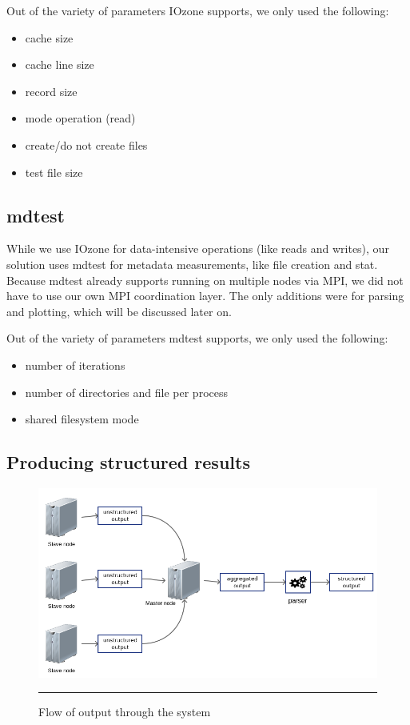 Out of the variety of parameters IOzone supports, we only used the following:

\begin{itemize}

\item cache size
\item cache line size
\item record size
\item mode operation (read)
\item create/do not create files
\item test file size

\end{itemize}



\subsection{mdtest}

While we use IOzone for data-intensive operations (like reads and writes), our solution uses mdtest for metadata measurements, like file creation and stat. Because mdtest already supports running on multiple nodes via MPI, we did not have to use our own MPI coordination layer. The only additions were for parsing and plotting, which will be discussed later on.

Out of the variety of parameters mdtest supports, we only used the following:

\begin{itemize}

\item number of iterations
\item number of directories and file per process
\item shared filesystem mode

\end{itemize}






\subsection{Producing structured results}


\begin{figure}[H]
  \centering
    \includegraphics[scale=0.5]{Figures/output_flow.png}
    \rule{25em}{0.5pt}
  \caption[Flow of output through the system]{Flow of output through the system}
  \label{fig:output_flow}
\end{figure}

